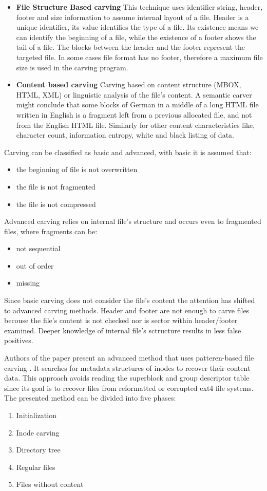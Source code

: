 \documentclass{acm_proc_article-sp}
\begin{document}
\begin{itemize}
\item \textbf{File Structure Based carving}
This technique uses identifier string, header, footer and size information to assume internal layout of a file. Header is a unique identifier, its value identifies the type of a file. Its existence means we can identify the beginning of a file, while the existence of a footer shows the tail of a file.
The blocks between the header and the footer represent the targeted file. In some cases file format has no footer, therefore a maximum file size is used in the carving program.
\item \textbf{Content based carving}
Carving based on content structure (MBOX, HTML, XML) or linguistic analysis of the file's content. A semantic carver might conclude that some blocks of German in a middle of a long HTML file written in English is a fragment left from a previous allocated file, and not from the English HTML file. Similarly for other content characteristics like, character count, information entropy, white and black listing of data.
\end{itemize}
Carving can be classified as basic and advanced, with basic it is assumed that:
\begin{itemize} 
\item the beginning of file is not overwritten
\item the file is not fragmented
\item the file is not compressed
\end{itemize}
Advanced carving relies on internal file's structure and occurs even to fragmented files, where fragments can be:
\begin{itemize} 
\item not sequential
\item out of order
\item missing
\end{itemize}
Since basic carving does not consider the file's content the  attention has shifted to  advanced  carving methods. Header and footer are not enough to carve files becouse the file's content is not checked nor is sector within header/footer examined. Deeper knowledge of internal file's sctructure results in less false positives. 

Authors of the paper present an advanced method that uses patteren-based file carving . It searches for metadata structures of inodes to recover their content data. This approach avoids reading the superblock and group descriptor table since its goal is to recover files from reformatted or corrupted ext4 file systems. The presented method can be divided into five phases\cite{merola2008data}:
\begin{enumerate}
\item Initialization
\item Inode carving
\item Directory tree
\item Regular files
\item Files without content
\end{enumerate}
\end{document}
